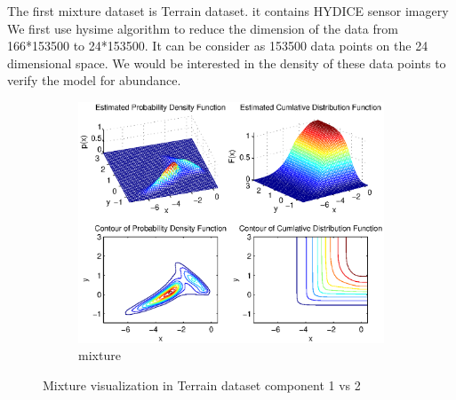 \documentclass[14pt]{book}
\begin{document}
The first mixture dataset is Terrain dataset. it contains HYDICE sensor imagery We first use hysime algorithm to reduce the dimension of the data from  166*153500 to 24*153500. It can be consider as 153500 data points on the 24 dimensional space. We would be interested in the density of these data points to verify the model for abundance. 
 \begin{figure}
        \centering
        \begin{subfigure}[b]{1.0\textwidth}
                \centering
                \includegraphics[width=\textwidth]{terrainDensity1vs2.eps}
                \caption{mixture }
                \label{fig:Mixture visualization in Terrain dataset component 1 vs 2}
        \end{subfigure}%

        \caption{Mixture visualization in Terrain dataset component 1 vs 2 }\label{fig:animals}
\end{figure}
\end{document}
